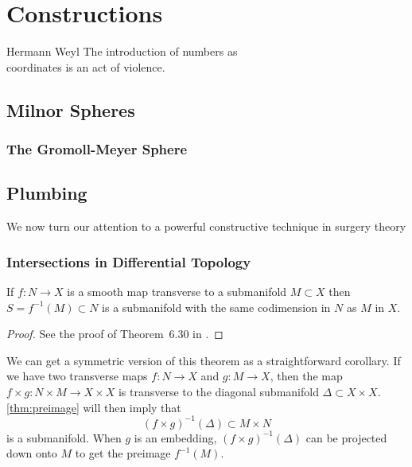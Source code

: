 \chapter{Constructions}\label{chap:constructions}

\begin{epigraph}{14em}{Hermann Weyl}
  The introduction of numbers as \\
  coordinates is an act of violence.
\end{epigraph}


\pagebreak
\section{Milnor Spheres}\label{sec:milnor-spheres}
\cite{milnor1956manifolds}

\subsection{The Gromoll-Meyer Sphere}\label{sec:gromoll-meyer}
\cite{gromollmeyer1974curvature}

\pagebreak
\section{Plumbing}\label{sec:plumbing}

We now turn our attention to a powerful constructive technique in surgery theory 


\subsection{Intersections in Differential Topology}\label{sec:differential-topology-intersections}

\begin{theorem}\label{thm:preimage}
	If $f : N \to X$ is a smooth map transverse to a submanifold $M\subset X$ then $S=f^{-1}(M)\subset N$ is a submanifold with the same codimension in $N$ as $M$ in $X$.
\end{theorem}
\begin{proof}
	See the proof of Theorem~6.30 in \cite{lee2013smooth}.
\end{proof}

\begin{remark}\label{rmk:symmetric-preimage-theorem}
	We can get a symmetric version of this theorem as a straightforward corollary. If we have two transverse maps $f : N\to X$ and $g : M\to X$, then the map $f\times g : N\times M \to X\times X$ is transverse to the diagonal submanifold $\Delta\subset X\times X$. \cref{thm:preimage} will then imply that
	\[
		(f\times g)^{-1}(\Delta) \subset M\times N
	\]
	is a submanifold. When $g$ is an embedding, $(f\times g)^{-1}(\Delta)$ can be projected down onto $M$ to get the preimage $f^{-1}(M)$.
\end{remark}

